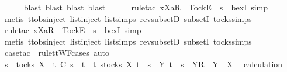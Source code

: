 \ \ \ \ \isamarkupfalse%
\ {\isacharparenleft}blast{\isacharcomma}\ blast{\isacharcomma}\ blast{\isacharcomma}\ blast{\isacharparenright}\isanewline
\ \ \ \ \isamarkupfalse%
\ {\isacharparenleft}rule{\isacharunderscore}tac\ x{\isacharequal}{\isachardoublequoteopen}{\isacharbrackleft}Xa{\isacharbrackright}\isactrlsub R\ {\isacharhash}\ {\isacharbrackleft}Tock{\isacharbrackright}\isactrlsub E\ {\isacharhash}\ s{\isachardoublequoteclose}\ \ bexI{\isacharcomma}\ simp{\isacharparenright}\isanewline
\ \ \ \ \isamarkupfalse%
\ {\isacharparenleft}metis\ ttobs{\isachardot}inject{\isacharparenleft}{}{\isacharparenright}\ list{\isachardot}inject\ list{\isachardot}simps{\isacharparenleft}{}{\isacharparenright}\ rev{\isacharunderscore}subsetD\ subsetI\ tocks{\isachardot}simps{\isacharparenright}\isanewline
\ \ \ \ \isamarkupfalse%
\ {\isacharparenleft}rule{\isacharunderscore}tac\ x{\isacharequal}{\isachardoublequoteopen}{\isacharbrackleft}Xa{\isacharbrackright}\isactrlsub R\ {\isacharhash}\ {\isacharbrackleft}Tock{\isacharbrackright}\isactrlsub E\ {\isacharhash}\ s{\isachardoublequoteclose}\ \ bexI{\isacharcomma}\ simp{\isacharparenright}\isanewline
\ \ \ \ \isamarkupfalse%
\ {\isacharparenleft}metis\ ttobs{\isachardot}inject{\isacharparenleft}{}{\isacharparenright}\ list{\isachardot}inject\ list{\isachardot}simps{\isacharparenleft}{}{\isacharparenright}\ rev{\isacharunderscore}subsetD\ subsetI\ tocks{\isachardot}simps{\isacharparenright}\isanewline
\ \ \ \ \isamarkupfalse%
\ {\isacharparenleft}case{\isacharunderscore}tac\ {\isasymsigma}\ rule{\isacharcolon}ttWF{\isachardot}cases{\isacharcomma}\ auto{\isacharparenright}{\isacharplus}\isanewline
\ \ \ \ \isamarkupfalse%
\isanewline
\ \ \isamarkupfalse%
\ \isamarkupfalse%
\ {\isachardoublequoteopen}s\ {\isasymin}\ tocks\ X\ {\isasymLongrightarrow}\ t\ {\isasymlesssim}\isactrlsub C\ s\ {\isasymLongrightarrow}\ t\ {\isasymin}\ {\isacharbraceleft}t{\isachardot}\ {\isasymexists}s{\isasymin}tocks\ X{\isachardot}\ t\ {\isacharequal}\ s\ {\isasymor}\ {\isacharparenleft}{\isasymexists}Y{\isachardot}\ t\ {\isacharequal}\ s\ {\isacharat}\ {\isacharbrackleft}{\isacharbrackleft}Y{\isacharbrackright}\isactrlsub R{\isacharbrackright}\ {\isasymand}\ Y\ {\isasymsubseteq}\ X{\isacharparenright}{\isacharbraceright}{\isachardoublequoteclose}\ \isamarkupfalse%
\ calculation\ \isamarkupfalse%
